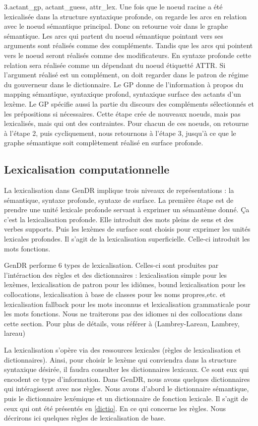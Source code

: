 3.actant\_gp, actant\_guess, attr\_lex. 
Une fois que le noeud racine a été lexicalisée dans la structure syntaxique profonde, on regarde les arcs en relation avec le noeud sémantique principal. Donc on retourne voir dans le graphe sémantique. Les arcs qui partent du noeud sémantique pointant vers ses arguments sont réalisés comme des compléments. Tandis que les arcs qui pointent vers le noeud seront réalisés comme des modificateurs. En syntaxe profonde cette relation sera réalisée comme un dépendant du noeud étiquetté ATTR. Si l'argument réalisé est un complément, on doit regarder dans le patron de régime du gouverneur dans le dictionnaire. Le GP donne de l'information à propos du mapping sémantique, syntaxique profond, syntaxique surface des actants d'un lexème. Le GP spécifie aussi la partie du discours des compléments sélectionnés et les prépositions si nécessaires. Cette étape crée de nouveaux noeuds, mais pas lexicalisés, mais qui ont des contraintes. Pour chacun de ces noeuds, on retourne à l'étape 2, puis cycliquement, nous retournons à l'étape 3,  jusqu'à ce que le graphe sémantique soit complètement réalisé en surface profonde.

\subsection{Lexicalisation computationnelle}

La lexicalisation dans GenDR implique trois niveaux de représentations : la sémantique, syntaxe profonde, syntaxe de surface. La première étape est de prendre une unité lexicale profonde servant à exprimer un sémantème donné. Ça c'est la lexicalisation profonde. Elle introduit des mots pleins de sens et des verbes supports. Puis les lexèmes de surface sont choisis pour exprimer les unités lexicales profondes. Il s'agit de la lexicalisation superficielle. Celle-ci introduit les mots fonctions.

GenDR performe 6 types de lexicalisation. Celles-ci sont produites par l'intéraction des règles et des dictionnaires : lexicalisation simple pour les lexèmes, lexicalisation de patron pour les idiômes, bound lexicalisation pour les collocations, lexicalisation à base de classes pour les noms propres,etc. et lexicalisation fallback pour les mots inconnus et lexicalisation grammaticale pour les mots fonctions.  Nous ne traiterons pas des idiomes ni des collocations dans cette section. Pour plus de détails, vous référer à (Lambrey-Lareau, Lambrey, lareau)

La lexicalisation s'opère via des ressources lexicales (règles de lexicalisation et dictionnaires). Ainsi, pour choisir le lexème qui conviendra dans la structure syntaxique désirée, il faudra consulter les dictionnaires lexicaux. Ce sont eux qui encodent ce type d'information. Dans GenDR, nous avons quelques dictionnaires qui intéragissent avec nos règles. Nous avons d'abord le dictionnaire sémantique, puis le dictionnaire lexémique et un dictionnaire de fonction lexicale. Il s'agit de ceux qui ont été présentés en \ref{dictio}. En ce qui concerne les règles. Nous décrirons ici quelques règles de lexicalisation de base.


